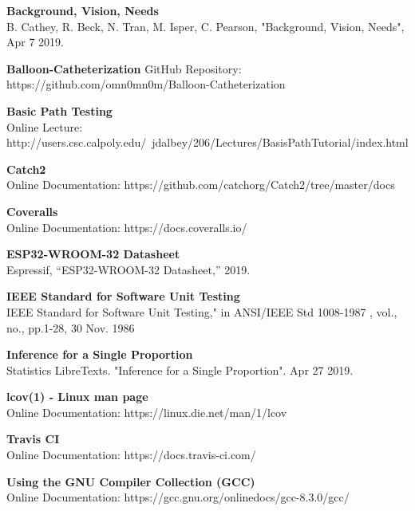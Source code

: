\documentclass[12pt]{article}
\begin{document}
    \begin{doclist}
        \item \textbf{Background, Vision, Needs} \\ B. Cathey, R. Beck, N. Tran, M. Isper, C. Pearson, "Background, Vision, Needs", Apr 7 2019.
        \item \textbf{Balloon-Catheterization} GitHub Repository: https://github.com/omn0mn0m/Balloon-Catheterization
        \item \textbf{Basic Path Testing} \\ Online Lecture: \\ http://users.csc.calpoly.edu/~jdalbey/206/Lectures/BasisPathTutorial/index.html
        \item \textbf{Catch2} \\ Online Documentation: https://github.com/catchorg/Catch2/tree/master/docs
        \item \textbf{Coveralls} \\ Online Documentation: https://docs.coveralls.io/
        \item \textbf{ESP32-WROOM-32 Datasheet} \\ Espressif, “ESP32-WROOM-32 Datasheet,” 2019.
        \item \textbf{IEEE Standard for Software Unit Testing} \\ IEEE Standard for Software Unit Testing," in ANSI/IEEE Std 1008-1987 , vol., no., pp.1-28, 30 Nov. 1986
        \item \textbf{Inference for a Single Proportion} \\ Statistics LibreTexts. "Inference for a Single Proportion". Apr 27 2019.
        \item \textbf{lcov(1) - Linux man page} \\ Online Documentation: https://linux.die.net/man/1/lcov
        \item \textbf{Travis CI} \\ Online Documentation: https://docs.travis-ci.com/
        \item \textbf{Using the GNU Compiler Collection (GCC)} \\ Online Documentation: https://gcc.gnu.org/onlinedocs/gcc-8.3.0/gcc/
    \end{doclist}
\end{document}
